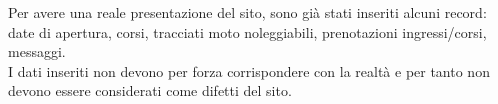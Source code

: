 Per avere una reale presentazione del sito, sono già stati inseriti alcuni record: date di apertura, corsi, tracciati moto noleggiabili, prenotazioni ingressi/corsi, messaggi.\\
I dati inseriti non devono per forza corrispondere con la realtà e per tanto non devono essere considerati come difetti del sito.